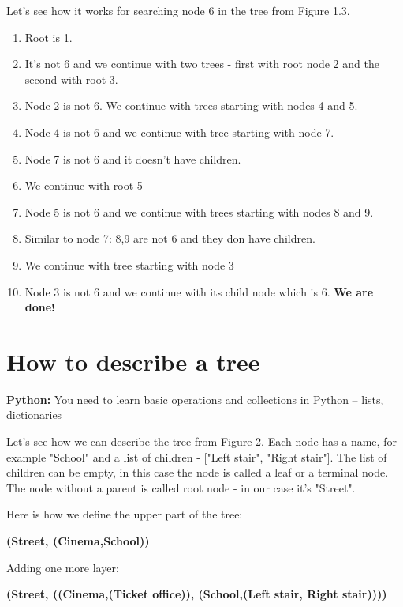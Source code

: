 Let's see how it works for searching node 6 in the tree from Figure 1.3.

\begin{leftborder}
\begin{enumerate}
\item Root is 1.
\item It's not 6 and we continue with two trees - first with root node 2
and the second with root 3.
\item Node 2 is not 6. We continue with trees starting with nodes 4 and 5.
\item Node 4 is not 6 and we continue with tree starting with node 7.
\item Node 7 is not 6 and it doesn't have children.
\item We continue with root 5
\item Node 5 is not 6 and we continue with trees starting
with nodes 8 and 9.
\item Similar to node 7: 8,9 are not 6 and they don have children.
\item We continue with tree starting with node 3
\item Node 3 is not 6 and we continue with its child node which is 6.
\textbf{We are done!}
\end{enumerate}
\end{leftborder}


\section{How to describe a tree}

\begin{tcolorbox}
\textbf{Python:} 
You need to learn basic operations and collections in 
Python -- lists, dictionaries
\end{tcolorbox}

Let's see how we can
describe the tree from Figure 2. Each node has a name, for example "School"
and a list of children - ["Left stair", "Right stair"]. The list 
of children can be empty, in this case the node is called a leaf 
or a terminal node. The node without
a parent is called root node - in our case it's "Street".

Here is how we define
the upper part of the tree:

\medskip
\textbf{(Street, (Cinema,School))}
\medskip

Adding one more layer:

\medskip
\textbf{(Street, ((Cinema,(Ticket office)), (School,(Left stair, Right stair))))}
\medskip

